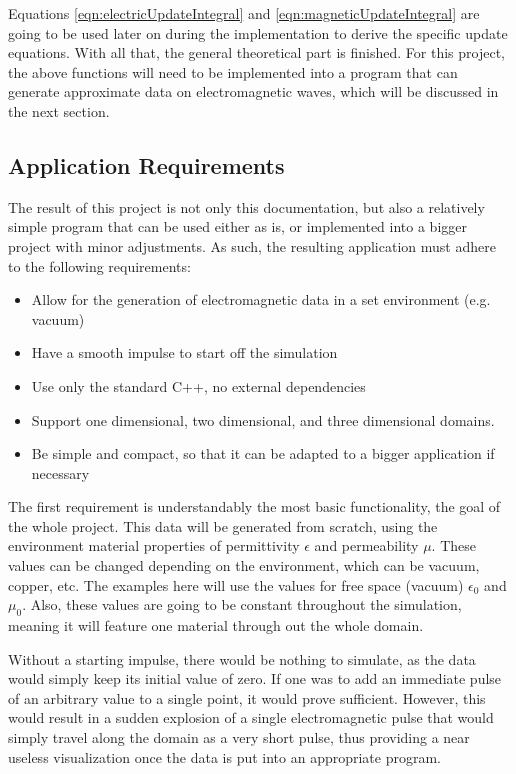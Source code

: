 Equations \ref{eqn:electricUpdateIntegral} and \ref{eqn:magneticUpdateIntegral} are going to be used later on during the implementation to derive the specific update equations. With all that, the general theoretical part is finished. For this project, the above functions will need to be implemented into a program that can generate approximate data on electromagnetic waves, which will be discussed in the next section.

\subsection{Application Requirements}

The result of this project is not only this documentation, but also a relatively simple program that can be used either as is, or implemented into a bigger project with minor adjustments. As such, the resulting application must adhere to the following requirements:

\begin{itemize}
	\item Allow for the generation of electromagnetic data in a set environment (e.g. vacuum)
	\item Have a smooth impulse to start off the simulation
	\item Use only the standard C++, no external dependencies
	\item Support one dimensional, two dimensional, and three dimensional domains.
	\item Be simple and compact, so that it can be adapted to a bigger application if necessary
\end{itemize}

The first requirement is understandably the most basic functionality, the goal of the whole project. This data will be generated from scratch, using the environment material properties of permittivity $\epsilon$ and permeability $\mu$. These values can be changed depending on the environment, which can be vacuum, copper, etc. The examples here will use the values for free space (vacuum) $\epsilon_{0}$ and $\mu_{0}$. Also, these values are going to be constant throughout the simulation, meaning it will feature one material through out the whole domain. 

Without a starting impulse, there would be nothing to simulate, as the data would simply keep its initial value of zero. If one was to add an immediate pulse of an arbitrary value to a single point, it would prove sufficient. However, this would result in a sudden explosion of a single electromagnetic pulse that would simply travel along the domain as a very short pulse, thus providing a near useless visualization once the data is put into an appropriate program. 

